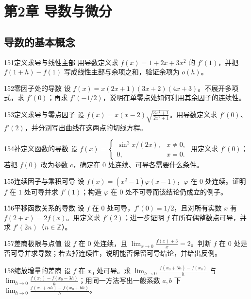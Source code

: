 \section{第2章 导数与微分}
\subsection{导数的基本概念}
\begin{exercise}{151}{定义求导与线性主部}
用导数定义求 $f(x)=1+2x+3x^2$ 的 $f'(1)$，并把 $f(1+h)-f(1)$ 写成线性主部与余项之和，验证余项为 $o(h)$。
\end{exercise}
\begin{exercise}{152}{零因子处的导数}
设 $f(x)=x(2x+1)(3x+2)(4x+3)$。不展开多项式，求 $f'(0)$；再求 $f'(-1/2)$，说明在单零点处如何利用其余因子的连续性。
\end{exercise}
\begin{exercise}{153}{定义求导与零点因子}
设 $f(x)=x(x-2)\sqrt{\frac{3x^2+1}{2x^2+1}}$。用导数定义求 $f'(0)$、$f'(2)$，并分别写出曲线在这两点的切线方程。
\end{exercise}
\begin{exercise}{154}{补定义函数的导数}
设 $f(x)=\begin{cases}\sin^2x/(2x),&x\ne0,\\0,&x=0.\end{cases}$ 用定义求 $f'(0)$；若把 $f(0)$ 改为参数 $c$，确定在 $0$ 处连续、可导各需要什么条件。
\end{exercise}
\begin{exercise}{155}{连续因子与乘积可导}
设 $f(x)=(x^2-1)\varphi(x-1)$，$\varphi$ 在 $0$ 处连续。证明 $f$ 在 $1$ 处可导并求 $f'(1)$；构造 $\varphi$ 在 $0$ 处不可导而该结论仍成立的例子。
\end{exercise}
\begin{exercise}{156}{平移函数关系的导数}
设 $f$ 在 $0$ 处可导，$f'(0)=1/2$，且对所有实数 $x$ 有 $f(2+x)=2f(x)$。用定义求 $f'(2)$；进一步证明 $f$ 在所有偶整数点可导，并求 $f'(2n)$（$n\in\mathbb Z$）。
\end{exercise}
\begin{exercise}{157}{差商极限与点值}
设 $f$ 在 $0$ 处连续，且 $\lim_{x\to0}\frac{f(x)+3}{x}=2$。判断 $f$ 在 $0$ 处是否可导并求导数；若去掉连续性，说明能否保留可导结论，并给出反例。
\end{exercise}
\begin{exercise}{158}{缩放增量的差商}
设 $f$ 在 $x_0$ 处可导。求 $\lim_{h\to0}\frac{f(x_0+5h)-f(x_0)}h$ 与 $\lim_{h\to0}\frac{f(x_0)-f(x_0-3h)}h$；用同一方法写出一般系数 $a,b$ 下 $\lim_{h\to0}\frac{f(x_0+ah)-f(x_0+bh)}h$。
\end{exercise}
